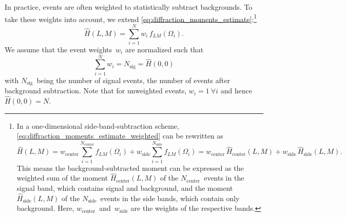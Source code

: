 In practice, events are often weighted to statistically subtract
backgrounds.  To take these weights into account, we extend
\cref{eq:diffraction_moments_estimate}:\footnote{In a one-dimensional
side-band-subtraction scheme,
\cref{eq:diffraction_moments_estimate_weighted} can be rewritten as
\begin{equation}
  \hat{H}(L, M)
  = w_\text{center} \sum_{i = 1}^{N_\text{center}} f_{L M}(\Omega_i)
  + w_\text{side}   \sum_{i = 1}^{N_\text{side}}   f_{L M}(\Omega_i)
  = w_\text{center}\, \hat{H}_\text{center}(L, M)
  + w_\text{side}\,   \hat{H}_\text{side}(L, M).
\end{equation}
This means the background-subtracted moment can be expressed as the
weighted sum of the moment $\hat{H}_\text{center}(L, M)$ of the
$N_\text{center}$~events in the signal band, which contains signal and
background, and the moment $\hat{H}_\text{side}(L, M)$ of the
$N_\text{side}$~events in the side bands, which contain only
background.  Here, $w_\text{center}$~and~$w_\text{side}$ are the
weights of the respective bands.}
\begin{equation}
  \label{eq:diffraction_moments_estimate_weighted}
  \hat{H}(L, M)
  = \sum_{i = 1}^N w_i\, f_{L M}(\Omega_i).
\end{equation}
We assume that the event weights~$w_i$ are normalized such that
\begin{equation}
  \label{eq:event_weights_norm}
  \sum_{i = 1}^N w_i
  = N_\text{sig}
  = \hat{H}(0, 0)
\end{equation}
with $N_\text{sig}$~being the number of signal events, \ie the number
of events after background subtraction.  Note that for unweighted
events, $w_i = 1~ \forall i$ and hence $\hat{H}(0, 0) = N$.

